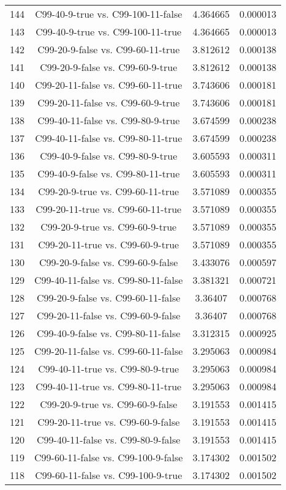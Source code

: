 \documentclass[a4paper,10pt]{article}
\begin{document}
\begin{landscape}
\begin{table}[!htp]
\begin{tabular}{cccc}
144&C99-40-9-true vs. C99-100-11-false&4.364665&0.000013\\
143&C99-40-9-true vs. C99-100-11-true&4.364665&0.000013\\
142&C99-20-9-false vs. C99-60-11-true&3.812612&0.000138\\
141&C99-20-9-false vs. C99-60-9-true&3.812612&0.000138\\
140&C99-20-11-false vs. C99-60-11-true&3.743606&0.000181\\
139&C99-20-11-false vs. C99-60-9-true&3.743606&0.000181\\
138&C99-40-11-false vs. C99-80-9-true&3.674599&0.000238\\
137&C99-40-11-false vs. C99-80-11-true&3.674599&0.000238\\
136&C99-40-9-false vs. C99-80-9-true&3.605593&0.000311\\
135&C99-40-9-false vs. C99-80-11-true&3.605593&0.000311\\
134&C99-20-9-true vs. C99-60-11-true&3.571089&0.000355\\
133&C99-20-11-true vs. C99-60-11-true&3.571089&0.000355\\
132&C99-20-9-true vs. C99-60-9-true&3.571089&0.000355\\
131&C99-20-11-true vs. C99-60-9-true&3.571089&0.000355\\
130&C99-20-9-false vs. C99-60-9-false&3.433076&0.000597\\
129&C99-40-11-false vs. C99-80-11-false&3.381321&0.000721\\
128&C99-20-9-false vs. C99-60-11-false&3.36407&0.000768\\
127&C99-20-11-false vs. C99-60-9-false&3.36407&0.000768\\
126&C99-40-9-false vs. C99-80-11-false&3.312315&0.000925\\
125&C99-20-11-false vs. C99-60-11-false&3.295063&0.000984\\
124&C99-40-11-true vs. C99-80-9-true&3.295063&0.000984\\
123&C99-40-11-true vs. C99-80-11-true&3.295063&0.000984\\
122&C99-20-9-true vs. C99-60-9-false&3.191553&0.001415\\
121&C99-20-11-true vs. C99-60-9-false&3.191553&0.001415\\
120&C99-40-11-false vs. C99-80-9-false&3.191553&0.001415\\
119&C99-60-11-false vs. C99-100-9-false&3.174302&0.001502\\
118&C99-60-11-false vs. C99-100-9-true&3.174302&0.001502\\

\end{tabular}
\end{table}
\end{landscape}
\end{document}
